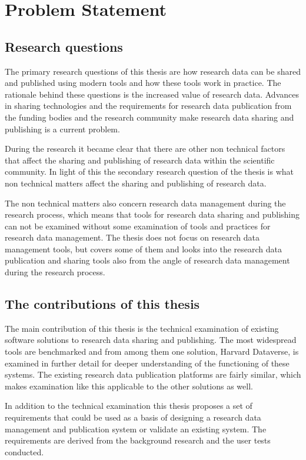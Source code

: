 \chapter{Problem Statement}
\label{chapter:problem}

\section{Research questions}

The primary research questions of this thesis are how research data can be shared
and published
using modern tools and how these tools work in practice. The rationale behind these questions is the increased
value of research data. Advances in sharing technologies and the requirements
for research data publication from the funding bodies and the research community
make research data sharing and publishing is a current problem.

During the research it became clear that there are other non technical
factors that affect the sharing and publishing of research data within the scientific community. In light
of this the secondary research question of the thesis is what non technical matters
affect the sharing and publishing of research data.

The non technical matters
also concern research data management during the research process, which means
that tools for research data sharing and publishing can not be examined without
some examination of tools and practices for research data management. The
thesis does not focus on research data management tools, but covers some of
them and looks into the research data publication and sharing tools also from
the angle of research data management during the research process.

\section{The contributions of this thesis}

The main contribution of this thesis is the technical examination of existing
software solutions to research data sharing and publishing. The most widespread tools are
benchmarked and from among them one solution, Harvard Dataverse, is examined
in further detail for deeper understanding of the functioning of these systems.
The existing research data publication platforms are fairly similar, which
makes examination like this applicable to the other solutions as well.

In addition to the technical examination this thesis proposes a set of
requirements that could be used as a basis of designing a research data
management and publication system or validate an existing system.
The requirements are derived from the background research and the user tests
conducted.

